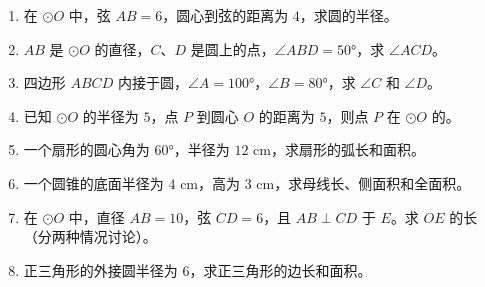 \documentclass[12pt, a4paper]{ctexart}
\begin{document}
\begin{enumerate}
  \item 在 $\odot O$ 中，弦 $AB = 6$，圆心到弦的距离为 $4$，求圆的半径。

  \item $AB$ 是 $\odot O$ 的直径，$C$、$D$ 是圆上的点，$\angle ABD = 50°$，求 $\angle ACD$。

  \item 四边形 $ABCD$ 内接于圆，$\angle A = 100°$，$\angle B = 80°$，求 $\angle C$ 和 $\angle D$。

  \item 已知 $\odot O$ 的半径为 $5$，点 $P$ 到圆心 $O$ 的距离为 $5$，则点 $P$ 在 $\odot O$ 的\blank{3cm}。

  \item 一个扇形的圆心角为 $60°$，半径为 $12$ cm，求扇形的弧长和面积。

  \item 一个圆锥的底面半径为 $4$ cm，高为 $3$ cm，求母线长、侧面积和全面积。

  \item 在 $\odot O$ 中，直径 $AB = 10$，弦 $CD = 6$，且 $AB \perp CD$ 于 $E$。求 $OE$ 的长（分两种情况讨论）。

  \item 正三角形的外接圆半径为 $6$，求正三角形的边长和面积。
\end{enumerate}

\vspace{10pt}
\end{document}
